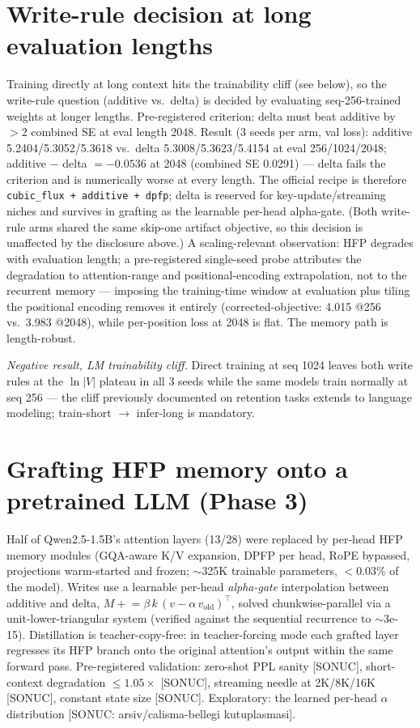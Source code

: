 \documentclass[11pt,a4paper]{article}
\newcommand{\code}[1]{\texttt{#1}}
\begin{document}
\section{Write-rule decision at long evaluation lengths}
Training directly at long context hits the trainability cliff (see below), so
the write-rule question (additive vs.\ delta) is decided by evaluating
seq-256-trained weights at longer lengths. Pre-registered criterion: delta
must beat additive by $>2$ combined SE at eval length 2048.
Result (3 seeds per arm, val loss): additive 5.2404/5.3052/5.3618 vs.\
delta 5.3008/5.3623/5.4154 at eval 256/1024/2048; additive $-$ delta
$= -0.0536$ at 2048 (combined SE 0.0291) --- delta fails the criterion and is
numerically worse at every length. The official recipe is therefore
\code{cubic\_flux + additive + dpfp}; delta is reserved for
key-update/streaming niches and survives in grafting as the learnable
per-head alpha-gate. (Both write-rule arms shared the same skip-one artifact
objective, so this decision is unaffected by the disclosure above.) A
scaling-relevant observation: HFP degrades with evaluation length; a
pre-registered single-seed probe attributes the degradation to attention-range
and positional-encoding extrapolation, not to the recurrent memory ---
imposing the training-time window at evaluation plus tiling the positional
encoding removes it entirely (corrected-objective: 4.015 @256 vs.\ 3.983
@2048), while per-position loss at 2048 is flat. The memory path is
length-robust.

\emph{Negative result, LM trainability cliff.} Direct training at seq 1024
leaves both write rules at the $\ln|V|$ plateau in all 3 seeds while the same
models train normally at seq 256 --- the cliff previously documented on
retention tasks extends to language modeling; train-short $\rightarrow$
infer-long is mandatory.

\section{Grafting HFP memory onto a pretrained LLM (Phase 3)}
Half of Qwen2.5-1.5B's attention layers (13/28) were replaced by per-head HFP
memory modules (GQA-aware K/V expansion, DPFP per head, RoPE bypassed,
projections warm-started and frozen; $\sim$325K trainable parameters,
$<0.03\%$ of the model). Writes use a learnable per-head \emph{alpha-gate}
interpolation between additive and delta,
$M \mathrel{+}= \beta\, k\,(v - \alpha\, v_{\mathrm{old}})^{\!\top}$,
solved chunkwise-parallel via a unit-lower-triangular system (verified
against the sequential recurrence to $\sim$3e-15). Distillation is
teacher-copy-free: in teacher-forcing mode each grafted layer regresses its
HFP branch onto the original attention's output within the same forward pass.
Pre-registered validation: zero-shot PPL sanity [SONUC], short-context
degradation $\le 1.05\times$ [SONUC], streaming needle at 2K/8K/16K [SONUC],
constant state size [SONUC]. Exploratory: the learned per-head $\alpha$
distribution [SONUC: arsiv/calisma-bellegi kutuplasmasi].
\end{document}
